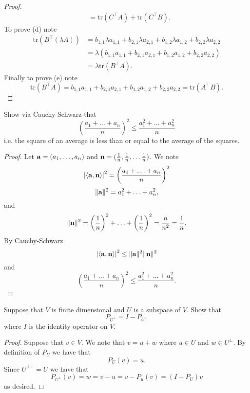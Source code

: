 \documentclass[11pt]{exam}
\theoremstyle{definition}
\newcommand{\tr}{\text{tr}}
\begin{document}
\begin{questions}
\begin{proof}
\begin{align*}
&=\tr (C^\top A)+\tr (C^\top B).
\end{align*}
To prove (d) note 
\begin{align*}
\tr(B^\top (\lambda A))&=b_{1,1}\lambda a_{1,1}+b_{2,1}\lambda a_{2,1}+b_{1,2}\lambda a_{1,2}+b_{2,2}\lambda a_{2,2}\\
&=\lambda(b_{1,1}a_{1,1}+b_{2,1}a_{2,1}+b_{1,2}a_{1,2}+b_{2,2}a_{2,2})\\
&=\lambda \tr(B^\top A).
\end{align*}
Finally to prove (e) note
\[\tr(B^\top A)=b_{1,1}a_{1,1}+b_{2,1}a_{2,1}+b_{1,2}a_{1,2}+b_{2,2}a_{2,2}=\tr(A^\top B).\]
\end{proof}
\question Show via Cauchy-Schwarz that 
\[\left(\frac{a_1+\ldots +a_n}{n}\right)^2\leq \frac{a_1^2+\ldots+a_n^2}{n}\]
i.e. the square of an average is less than or equal to the average of the squares. 
\begin{proof}
Let ${\bf a}=(a_1,\ldots, a_n)$ and ${\bf n}=(\frac{1}{n},\frac{1}{n},\ldots \frac{1}{n})$.
We note 
\[\left|\langle {\bf a},{\bf n}\rangle\right|^2=\left(\frac{a_1+\ldots +a_n}{n}\right)^2\]
\[\|{\bf a}\|^2=a_1^2+\ldots +a_n^2,\]
and
\[\|{\bf n}\|^2=\left(\frac{1}{n}\right)^2+\ldots +\left(\frac{1}{n}\right)^2=\frac{n}{n^2}=\frac{1}{n}.\]
 By Cauchy-Schwarz
\[\left|\langle {\bf a},{\bf n}\rangle\right|^2\leq \|{\bf a}\|^2\|{\bf n}\|^2\]
and 
\[\left(\frac{a_1+\ldots +a_n}{n}\right)^2\leq \frac{a_1^2+\ldots+a_n^2}{n}.\]
\end{proof}
\question Suppose that $V$ is finite dimensional and $U$ is a subspace of $V$. Show that 
\[P_{U^\bot}=I-P_U,\]
where $I$ is the identity operator on $V$. 
\begin{proof} Suppose that $v\in V$. We note that $v=u+w$ where $u\in U$ and $w\in U^\bot$. By definition of $P_U$ we have that 
\[P_U(v)=u.\]
Since $U^{\bot\bot}=U$ we have that 
\[P_{U^\bot}(v)=w=v-u=v-P_u(v)=(I-P_U)v\]
as desired. 
\end{proof}
\end{questions}
\end{document}
